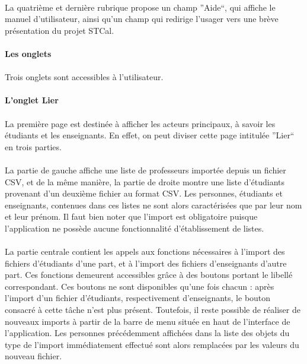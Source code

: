 \documentclass[a4paper,10pt]{report}
\begin{document}
	  \paragraph{}
	    La quatrième et dernière rubrique propose un champ ''Aide``, qui affiche le manuel d'utilisateur, ainsi qu'un champ qui redirige l'usager vers une brève présentation du projet STCal. 
      
	  \paragraph{Les onglets}
	  
	  
	    \paragraph{}
	      Trois onglets sont accessibles à l'utilisateur.
	  
	    \paragraph{L'onglet Lier}
	      \paragraph{}
		La première page est destinée à afficher les acteurs principaux, à savoir les étudiants et les enseignants. 
		En effet, on peut diviser cette page intitulée ''Lier`` en trois parties.
		
	      \paragraph{}
		La partie de gauche affiche une liste de professeurs importée depuis un fichier CSV, et de la même manière, la partie de droite montre une liste d'étudiants provenant d'un deuxième fichier au format CSV.
		Les personnes, étudiants et enseignants, contenues dans ces listes ne sont alors caractérisées que par leur nom et leur prénom.
		Il faut bien noter que l'import est obligatoire puisque l'application ne possède aucune fonctionnalité d'établissement de listes.
	      
	      \paragraph{}
		La partie centrale contient les appels aux fonctions nécessaires à l'import des fichiers d'étudiants d'une part, et à l'import des fichiers d'enseignants d'autre part.
		Ces fonctions demeurent accessibles grâce à des boutons portant le libellé correspondant.
		Ces boutons ne sont disponibles qu'une fois chacun : après l'import d'un fichier d'étudiants, respectivement d'enseignants, le bouton consacré à cette tâche n'est plus présent.
		Toutefois, il reste possible de réaliser de nouveaux imports à partir de la barre de menu située en haut de l'interface de l'application.
		Les personnes précédemment affichées dans la liste des objets du type de l'import immédiatement effectué sont alors remplacées par les valeurs du nouveau fichier.  
		
\end{document}
